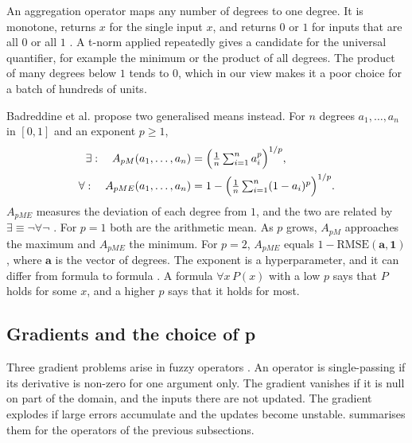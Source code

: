 An aggregation operator maps any number of degrees to one degree. It is
monotone, returns $x$ for the single input $x$, and returns $0$ or $1$ for
inputs that are all $0$ or all $1$ \citep{badreddine2022ltn}. A t-norm applied
repeatedly gives a candidate for the universal quantifier, for example the
minimum or the product of all degrees. The product of many degrees below $1$
tends to $0$, which in our view makes it a poor choice for a batch of hundreds
of units.

Badreddine et al. propose two generalised means instead. For $n$ degrees
$a_1,\dots,a_n$ in $[0,1]$ and an exponent $p\geq 1$,
\begin{align}
\exists:\quad A_{pM}(a_1,\dots,a_n) &=
  \Bigl(\tfrac{1}{n}\textstyle\sum_{i=1}^{n} a_i^{p}\Bigr)^{1/p}, \\
\forall:\quad A_{pME}(a_1,\dots,a_n) &=
  1-\Bigl(\tfrac{1}{n}\textstyle\sum_{i=1}^{n}(1-a_i)^{p}\Bigr)^{1/p}.
\end{align}
$A_{pME}$ measures the deviation of each degree from $1$, and the two are
related by $\exists\equiv\neg\forall\neg$ \citep{badreddine2022ltn}. For $p=1$
both are the arithmetic mean. As $p$ grows, $A_{pM}$ approaches the maximum
and $A_{pME}$ the minimum. For $p=2$, $A_{pME}$ equals
$1-\mathrm{RMSE}(\mathbf{a},\mathbf{1})$, where $\mathbf{a}$ is the vector of
degrees. The exponent is a hyperparameter, and it can differ from formula to
formula \citep{badreddine2022ltn}. A formula $\forall x\,P(x)$ with a low $p$
says that $P$ holds for some $x$, and a higher $p$ says that it holds for most.

\subsection{Gradients and the choice of p}
\label{sec:gradient-problems}

Three gradient problems arise in fuzzy operators \citep{badreddine2022ltn}. An
operator is single-passing if its derivative is non-zero for one argument
only. The gradient vanishes if it is null on part of the domain, and the
inputs there are not updated. The gradient explodes if large errors
accumulate and the updates become unstable. 
summarises them for the operators of the previous subsections.

